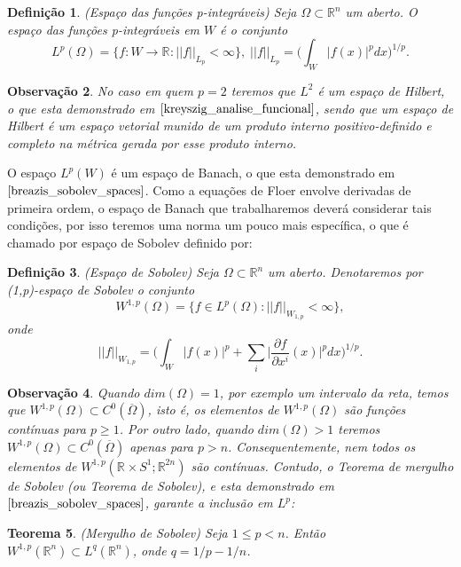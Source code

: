 \documentclass[12pt]{book}
\newtheorem{teorema}{Teorema}[section]
\newtheorem{definicao}[teorema]{Definição}
\newtheorem{observacao}[teorema]{Observação}
\newcommand{\circulo}{S^{1}}
\newcommand{\derivadaparcial}[2]{\frac{\partial #1}{\partial #2}}
\newcommand{\espacosobolev}[1]{W^{1,p}(#1)}
\newcommand{\espacosobolevcontradominio}[2]{W^{1,p}(#1;#2)}
\newcommand{\normaLp}[1]{||#1||_{L_{p}}}
\newcommand{\normaWp}[1]{||#1||_{W_{1,p}}}
\newcommand{\retacartesianocirculo}{\real{} \times \circulo}
\newcommand{\real}[1]{\mathbb{R}^{#1}}
\begin{document}
	\begin{definicao}
		(Espaço das funções p-integráveis) Seja $\Omega\subset \real{n}$ um aberto. O espaço das funções p-integráveis em $W$ é o conjunto 
		$$
		L^{p}(\Omega) = \{f:W \to \real{} : \normaLp{f} < \infty \}, \; \normaLp{f} = \Big(\int_{W}|f(x)|^{p}dx\Big)^{1/p}.
		$$
	\end{definicao}
	
	\begin{observacao}
		No caso em quem $p=2$ teremos que $L^{2}$ é um espaço de Hilbert, o que esta demonstrado em $\cite{kreyszig_analise_funcional}$, sendo que um espaço de Hilbert é um espaço vetorial munido de um produto interno positivo-definido e completo na métrica gerada por esse produto interno.
	\end{observacao}
	
	O espaço $L^{p}(W)$ é um espaço de Banach, o que esta demonstrado em $\cite{breazis_sobolev_spaces}$. Como a equações de Floer envolve derivadas de primeira ordem, o espaço de Banach que trabalharemos deverá considerar tais condições, por isso teremos uma norma um pouco mais específica, o que é chamado por espaço de Sobolev definido por:
	
	\begin{definicao}
		(Espaço de Sobolev)  Seja $\Omega \subset \real{n}$ um aberto. Denotaremos por (1,p)-espaço de Sobolev o conjunto
		$$
		W^{1,p}(\Omega) = \{f \in L^{p}(\Omega) : \normaWp{f} <\infty  \},
		$$
		onde 
		$$
		\normaWp{f} = \Big(\int_{W}|f(x)|^{p} + \sum_{i} \Big|\derivadaparcial{f}{x^{i}}(x)\Big|^{p}dx\Big)^{1/p}.
		$$
	\end{definicao}
	
	\begin{observacao}\label{observacao}
		Quando $dim(\Omega) = 1$, por exemplo um intervalo da reta, temos que $\espacosobolev{\Omega} \subset C^{0}(\overline{\Omega})$, isto é, os elementos de $\espacosobolev{\Omega}$ são funções contínuas para $p \geq 1$. Por outro lado, quando $dim(\Omega)>1$ teremos $\espacosobolev{\Omega} \subset C^{0}(\overline{\Omega})$ apenas para $p>n$. Consequentemente, nem todos os elementos de  $\espacosobolevcontradominio{\retacartesianocirculo}{\real{2n}}$  são contínuas. Contudo, o Teorema de mergulho de Sobolev (ou Teorema de Sobolev), e esta demonstrado em $\cite{breazis_sobolev_spaces}$, garante a inclusão em $L^{p}$:
	\end{observacao}
	
	\begin{teorema}\label{teorema_sobolev}
		(Mergulho de Sobolev) Seja $1 \leq p < n$. Então $\espacosobolev{\real{n}} \subset L^{q}(\real{n})$, onde $q = 1/p -1/n$.
	\end{teorema}
	
\end{document}
